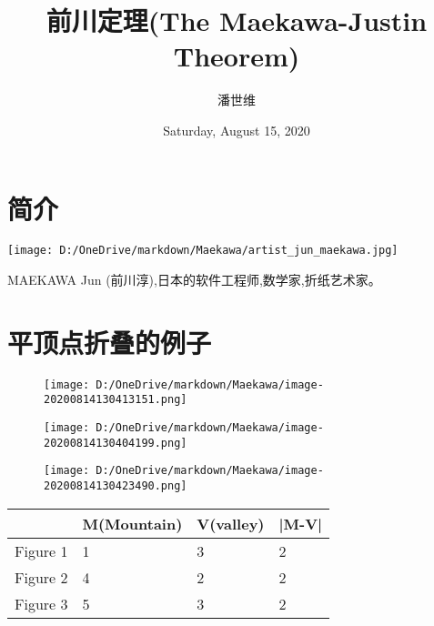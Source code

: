 \documentclass[a4paper,12pt]{article}
\begin{document}
\title {前川定理(The Maekawa-Justin Theorem)}
\author{潘世维}
\date{Saturday, August 15, 2020}
\maketitle
\section{简介} 
\texttt{[image: D:/OneDrive/markdown/Maekawa/artist\_jun\_maekawa.jpg]}

MAEKAWA Jun (前川淳),日本的软件工程师,数学家,折纸艺术家。

\section{平顶点折叠的例子}  
\begin{flushright}
\begin{figure}[h]
    \centering 
    \begin{minipage}{0.4\linewidth}
    \centering    %
    \texttt{[image: D:/OneDrive/markdown/Maekawa/image-20200814130413151.png]}	 
    \caption{}
    \end{minipage}
    \hfill
    \begin{minipage}{0.4\linewidth}
    \centering    %
    \texttt{[image: D:/OneDrive/markdown/Maekawa/image-20200814130404199.png]}
    \caption{}
    \end{minipage}
    \texttt{[image: D:/OneDrive/markdown/Maekawa/image-20200814130423490.png]}
    \caption{}
\end{figure}
\end{flushright}

\begin{table}[]
    \begin{tabular}{|l|l|l|l|l|l|l|}
    \hline
             & \multicolumn{3}{c|}{M(Mountain)} & \multicolumn{2}{c|}{V(valley)} & |M-V|                    \\ \hline
    Figure 1 & \multicolumn{3}{l|}{1}           & \multicolumn{2}{l|}{3}         & {\color[HTML]{9A0000} 2} \\ \hline
    Figure 2 & \multicolumn{3}{l|}{4}           & \multicolumn{2}{l|}{2}         & {\color[HTML]{9A0000} 2} \\ \hline
    Figure 3 & \multicolumn{3}{l|}{5}           & \multicolumn{2}{l|}{3}         & {\color[HTML]{9A0000} 2} \\ \hline
    \end{tabular}
    \end{table}
\end{document}
